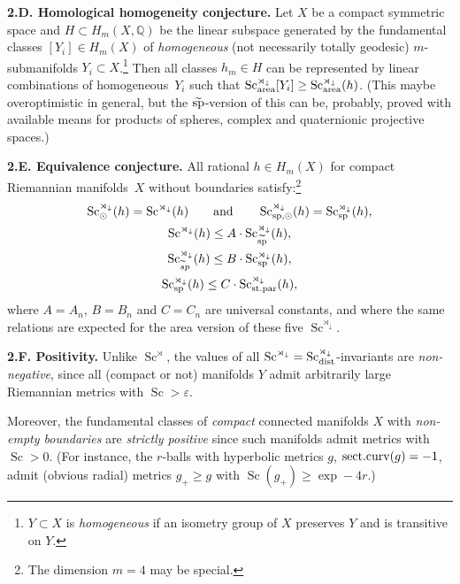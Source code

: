 \documentclass[pdftex]{sigma}
\numberwithin{equation}{section}
\begin{document}
\textbf{2.D. Homological homogeneity conjecture.}
 Let $X$ be a compact symmetric space
 and $H\subset H_ m(X, \mathbb Q)$ be the linear subspace generated by the fundamental classes
 $[Y_i]\in H_m(X)$ of {\it homogeneous} (not necessarily totally geodesic) $m$-submanifolds $Y_i\subset X$.\footnote{$Y\subset X$ is {\it homogeneous} if an isometry group of $X$ preserves $Y$ and is transitive on $Y$.}
Then all classes
 ${h_m\in H}$
 can be represented by linear combinations of homogeneous~$Y_i$ such that
 $\operatorname{Sc}^{\rtimes_\downarrow} _{\rm area}[Y_i]\geq \operatorname{Sc}^{\rtimes_\downarrow}_{\rm area}(h)$.
(This maybe overoptimistic in general, but the $\widetilde{\rm sp}$-version of this can be, probably, proved with available means for products of spheres, complex and quaternionic projective spaces.)

\textbf{2.E. Equivalence conjecture.} All rational $h\in H_m(X) $ for compact Riemannian manifolds~$X$ without boundaries
satisfy:\footnote{The dimension $m=4$ may be special.}
\begin{gather*}
 \operatorname{Sc}^{\rtimes_\downarrow}_\odot(h)=
\operatorname{Sc}^{\rtimes_\downarrow}(h)\qquad \text{and} \qquad \operatorname{Sc}^{\rtimes_\downarrow}_{{\rm sp},\odot}(h)=
\operatorname{Sc}^{\rtimes_\downarrow}_{\rm sp}(h),\\
\operatorname{Sc}^{\rtimes_\downarrow}(h)\leq
 A\cdot \operatorname{Sc}^{\rtimes_\downarrow} _{\widetilde {\rm sp}}(h),\\
\operatorname{Sc}^{\rtimes_\downarrow} _{{{\widetilde sp } }}(h)\leq B\cdot \operatorname{Sc}^{\rtimes_\downarrow} _{\rm sp}(h),\\
\operatorname{Sc}^{\rtimes_\downarrow} _{\rm sp}(h)\leq
C\cdot \operatorname{Sc}^{\rtimes_\downarrow} _{\rm st.par}(h),
\end{gather*}
where $A=A_n$, $B=B_n$ and $C=C_n$ are universal constants,
and where the same relations are expected for the area version of these five $\operatorname{Sc}^{\rtimes_\downarrow}$.

 \textbf {2.F. Positivity.} Unlike $\operatorname{Sc}^\rtimes$, the values of all $\operatorname{Sc}^{\rtimes_\downarrow}=\operatorname{Sc}_{\rm dist}^{\rtimes_\downarrow}$-invariants
 are {\it non-negative}, since all (compact or not) manifolds $Y$ admit arbitrarily large Riemannian metrics with $\operatorname{Sc}>\varepsilon$.

 Moreover, the fundamental classes of {\it compact} connected manifolds $X$ with {\it non-empty boundaries}
 are {\it strictly positive}
 since such manifolds admit metrics with $\operatorname{Sc}>0$.
 (For instance, the $r$-balls with hyperbolic metrics $g$, ${\rm sect.curv}(g)=-1$, admit (obvious radial) metrics $g_+\geq g$ with $\operatorname{Sc}(g_+)\geq \exp-4r$.)
\end{document}
